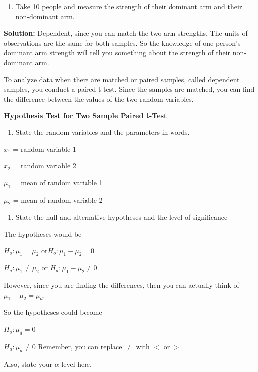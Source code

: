 \documentclass[]{book}
\providecommand{\tightlist}{%
  \setlength{\itemsep}{0pt}\setlength{\parskip}{0pt}}
\begin{document}
\begin{enumerate}
\def\labelenumi{\alph{enumi}.}
\setcounter{enumi}{2}
\tightlist
\item
  Take 10 people and measure the strength of their dominant arm and their non-dominant arm.
\end{enumerate}

\textbf{Solution:}
Dependent, since you can match the two arm strengths. The units of observations are the same for both samples. So the knowledge of one person's dominant arm strength will tell you something about the strength of their non-dominant arm.

To analyze data when there are matched or paired samples, called dependent samples, you conduct a paired t-test. Since the samples are matched, you can find the difference between the values of the two random variables.

\textbf{Hypothesis Test for Two Sample Paired t-Test}

\begin{enumerate}
\def\labelenumi{\arabic{enumi}.}
\tightlist
\item
  State the random variables and the parameters in words.
\end{enumerate}

\(x_1\) = random variable 1

\(x_2\) = random variable 2

\(\mu_1\) = mean of random variable 1

\(\mu_2\) = mean of random variable 2

\begin{enumerate}
\def\labelenumi{\arabic{enumi}.}
\setcounter{enumi}{1}
\tightlist
\item
  State the null and alternative hypotheses and the level of significance
\end{enumerate}

The hypotheses would be

\(H_o:\mu_1=\mu_2\) or\(H_o:\mu_1-\mu_2=0\)

\(H_a:\mu_1\ne \mu_2\) or \(H_a:\mu_1-\mu_2\ne0\)

However, since you are finding the differences, then you can actually think of \(\mu_1-\mu_2=\mu_d\).

So the hypotheses could become

\(H_o:\mu_d=0\)

\(H_a:\mu_d\ne 0\) Remember, you can replace \(\ne\) with \(<\) or \(>\).

Also, state your \(\alpha\) level here.
\end{document}

